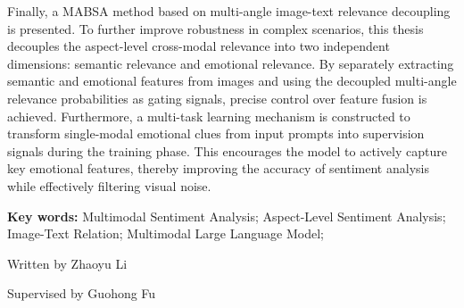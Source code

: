 \begin{eabstract}
Finally, a MABSA method based on multi-angle image-text relevance decoupling is presented. To further improve robustness in complex scenarios, this thesis decouples the aspect-level cross-modal relevance into two independent dimensions: semantic relevance and emotional relevance. By separately extracting semantic and emotional features from images and using the decoupled multi-angle relevance probabilities as gating signals, precise control over feature fusion is achieved. Furthermore, a multi-task learning mechanism is constructed to transform single-modal emotional clues from input prompts into supervision signals during the training phase. This encourages the model to actively capture key emotional features, thereby improving the accuracy of sentiment analysis while effectively filtering visual noise.

	\vskip 21bp
	{\bf{} Key words: }
	Multimodal Sentiment Analysis; 
	Aspect-Level Sentiment Analysis; 
	Image-Text Relation;
	 Multimodal Large Language Model; 
\end{eabstract}

\begin{flushright}
	Written by Zhaoyu Li
	
	Supervised by Guohong Fu
\end{flushright}

